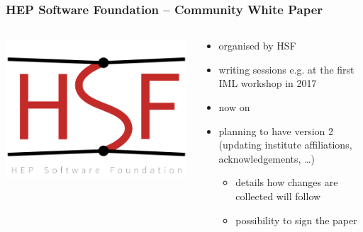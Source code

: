 \maketitle

\begin{frame}
  \frametitle{HEP Software Foundation -- Community White Paper}
  \begin{columns}
    \begin{column}{.3\textwidth}
      \includegraphics[width=\textwidth]{./hsf_logo_angled.png}
    \end{column}
    \begin{column}{.7\textwidth}
      \begin{itemize}
        \item organised by HSF
        \item writing sessions e.g. at the first IML workshop in 2017
        \item now on 
        \item planning to have version 2 (updating institute affiliations, acknowledgements, \dots)
          \begin{itemize}
              \item details how changes are collected will follow
              \item possibility to sign the paper
          \end{itemize}
      \end{itemize}
    \end{column}
  \end{columns}
\end{frame}

